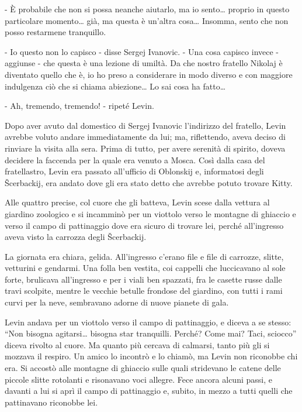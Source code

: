 - È probabile che non si possa neanche aiutarlo, ma io sento\ldots{} proprio in questo particolare momento\ldots{} già, ma questa è un'altra cosa\ldots{} Insomma, sento che non posso restarmene tranquillo. 

- Io questo non lo capisco - disse Sergej Ivanovic. - Una cosa capisco invece - aggiunse - che questa è una lezione di umiltà. Da che nostro fratello Nikolaj è diventato quello che è, io ho preso a considerare in modo diverso e con maggiore indulgenza ciò che si chiama abiezione\ldots{} Lo sai cosa ha fatto\ldots{} 

- Ah, tremendo, tremendo! - ripeté Levin. 

Dopo aver avuto dal domestico di Sergej Ivanovic l'indirizzo del fratello, Levin avrebbe voluto andare immediatamente da lui; ma, riflettendo, aveva deciso di rinviare la visita alla sera. Prima di tutto, per avere serenità di spirito, doveva decidere la faccenda per la quale era venuto a Mosca. Così dalla casa del fratellastro, Levin era passato all'ufficio di Oblonskij e, informatosi degli Šcerbackij, era andato dove gli era stato detto che avrebbe potuto trovare Kitty. 

Alle quattro precise, col cuore che gli batteva, Levin scese dalla vettura al giardino zoologico e si incamminò per un viottolo verso le montagne di ghiaccio e verso il campo di pattinaggio dove era sicuro di trovare lei, perché all'ingresso aveva visto la carrozza degli Šcerbackij. 

La giornata era chiara, gelida. All'ingresso c'erano file e file di carrozze, slitte, vetturini e gendarmi. Una folla ben vestita, coi cappelli che luccicavano al sole forte, brulicava all'ingresso e per i viali ben spazzati, fra le casette russe dalle travi scolpite, mentre le vecchie betulle frondose del giardino, con tutti i rami curvi per la neve, sembravano adorne di nuove pianete di gala. 

Levin andava per un viottolo verso il campo di pattinaggio, e diceva a se stesso: ``Non bisogna agitarsi\ldots{} bisogna star tranquilli. Perché? Come mai? Taci, sciocco'' diceva rivolto al cuore. Ma quanto più cercava di calmarsi, tanto più gli si mozzava il respiro. Un amico lo incontrò e lo chiamò, ma Levin non riconobbe chi era. Si accostò alle montagne di ghiaccio sulle quali stridevano le catene delle piccole slitte rotolanti e risonavano voci allegre. Fece ancora alcuni passi, e davanti a lui si aprì il campo di pattinaggio e, subito, in mezzo a tutti quelli che pattinavano riconobbe lei. 

